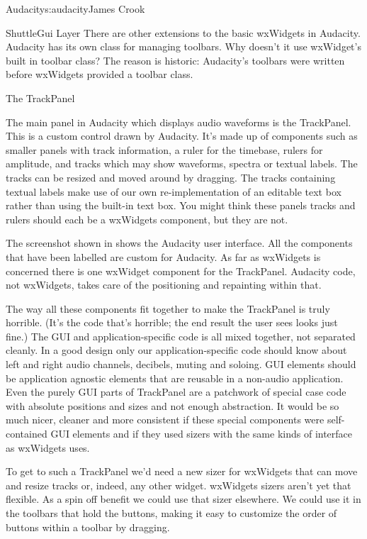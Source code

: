 \begin{aosachapter}{Audacity}{s:audacity}{James Crook}
\begin{aosasect1}{ShuttleGui Layer}
There are other extensions to the basic wxWidgets in Audacity.
Audacity has its own class for managing toolbars.  Why doesn't it use
wxWidget's built in toolbar class?  The reason is historic: Audacity's
toolbars were written before wxWidgets provided a toolbar class.

\end{aosasect1}

\begin{aosasect1}{The TrackPanel}

The main panel in Audacity which displays audio waveforms is the
TrackPanel.  This is a custom control drawn by Audacity.  It's made up
of components such as smaller panels with track information, a ruler
for the timebase, rulers for amplitude, and tracks which may show
waveforms, spectra or textual labels.  The tracks can be resized and
moved around by dragging.  The tracks containing textual labels make
use of our own re-implementation of an editable text box rather than
using the built-in text box.  You might think these panels tracks and
rulers should each be a wxWidgets component, but they are not.


The screenshot shown in  shows the Audacity user
interface.  All the components that have been labelled are custom for
Audacity.  As far as wxWidgets is concerned there is one wxWidget
component for the TrackPanel.  Audacity code, not wxWidgets, takes
care of the positioning and repainting within that.

The way all these components fit together to make the TrackPanel is
truly horrible.  (It's the code that's horrible; the end result the
user sees looks just fine.)  The GUI and application-specific code is
all mixed together, not separated cleanly.  In a good design only our
application-specific code should know about left and right audio
channels, decibels, muting and soloing.  GUI elements should be
application agnostic elements that are reusable in a non-audio
application.  Even the purely GUI parts of TrackPanel are a patchwork
of special case code with absolute positions and sizes and not enough
abstraction.  It would be so much nicer, cleaner and more consistent
if these special components were self-contained GUI elements and if
they used sizers with the same kinds of interface as wxWidgets uses.

To get to such a TrackPanel we'd need a new sizer for wxWidgets that
can move and resize tracks or, indeed, any other widget.  wxWidgets
sizers aren't yet that flexible.  As a spin off benefit we could use
that sizer elsewhere.  We could use it in the toolbars that hold the
buttons, making it easy to customize the order of buttons within a
toolbar by dragging.


\end{aosasect1}
\end{aosachapter}
